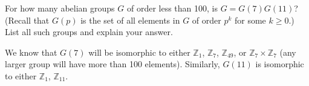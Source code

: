 \documentclass[11pt]{exam}
\def\Z{\mathbb Z}
\begin{document}
\begin{questions}
\clearpage







\question[8] For how many abelian groups $G$ of order less than 100, is $G = G(7)G(11)$?  (Recall that $G(p)$ is the set of all elements in $G$ of order $p^k$ for some $k\ge 0$.)  List all such groups and explain your answer.
\begin{solution}
  We know that $G(7)$ will be isomorphic to either $\Z_{1}$, $\Z_7$, $\Z_{49}$, or $\Z_{7}\times \Z_{7}$ (any larger group will have more than 100 elements).  Similarly, $G(11)$ is isomorphic to either $\Z_1$, $\Z_{11}$.


\end{solution}
\end{questions}
\end{document}

